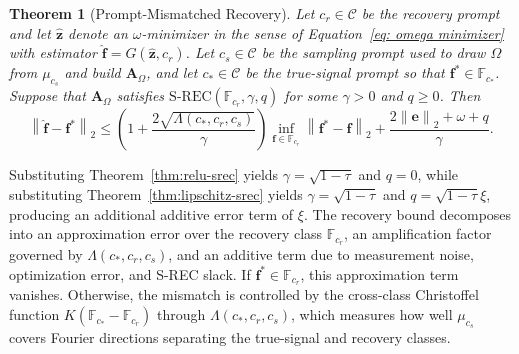 \documentclass{article}
\theoremstyle{plain}
\newtheorem{theorem}{Theorem}[section]
\theoremstyle{definition}
\theoremstyle{remark}
\begin{document}
\begin{theorem}[Prompt-Mismatched Recovery]
  \label{thm:prompt-mismatched-recovery}
 Let $c_r\in\mathcal C$ be the recovery prompt and let $\widehat{\mathbf z}$ denote an $\omega$-minimizer in the sense of Equation~\eqref{eq: omega minimizer} with estimator $\widehat{\mathbf f}=G(\widehat{\mathbf z},c_r)$. Let $c_s\in\mathcal C$ be the sampling prompt used to draw $\Omega$ from $\mu_{c_s}$ and build $\mathbf A_\Omega$, and let $c_* \in\mathcal C$ be the true-signal prompt so that $\mathbf f^* \in\mathbb{F}_{c_*}$.
  Suppose that $\mathbf A_\Omega$ satisfies $\mathrm{S\text{-}REC}\left(\mathbb{F}_{c_r},\gamma,q\right)$
  for some $\gamma>0$ and $q\geq 0$. Then
  \[
    \left\|\widehat{\mathbf f}-\mathbf f^*\right\|_2
    \le
    \left(
      1+
      \frac{2\sqrt{\Lambda\left(c_*,c_r,c_s\right)}}{\gamma}
    \right)
    \inf_{\mathbf f\in\mathbb{F}_{c_r}}
    \left\|\mathbf f^* - \mathbf f\right\|_2
    +
    \frac{2\left\|\mathbf e\right\|_2+\omega+q}{\gamma}.
  \]
\end{theorem}

Substituting Theorem~\ref{thm:relu-srec} yields $\gamma=\sqrt{1-\tau}$ and $q=0$, while substituting Theorem~\ref{thm:lipschitz-srec} yields $\gamma=\sqrt{1-\tau}$ and $q=\sqrt{1-\tau}\xi$, producing an additional additive error term of $\xi$. The recovery bound decomposes into an approximation error over the recovery class $\mathbb F_{c_r}$, an amplification factor governed by $\Lambda(c_*,c_r,c_s)$, and an additive term due to measurement noise, optimization error, and S-REC slack. If $\mathbf f^* \in \mathbb F_{c_r}$, this approximation term vanishes. Otherwise, the mismatch is controlled by the cross-class Christoffel function $K(\mathbb F_{c_*}-\mathbb F_{c_r})$ through $\Lambda(c_*,c_r,c_s)$, which measures how well $\mu_{c_s}$ covers Fourier directions separating the true-signal and recovery classes.
\end{document}
